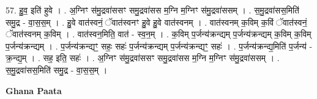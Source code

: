 \documentclass[17pt]{extarticle}
\begin{document}
57. हु॒व॒ इति॑ हुवे । . अ॒ग्निꣳ स॑मु॒द्रवा॑ससꣳ समु॒द्रवा॑सस म॒ग्नि म॒ग्निꣳ स॑मु॒द्रवा॑ससम् । . स॒मु॒द्रवा॑सस॒मिति॑ समु॒द्र - वा॒स॒स॒म् । . हु॒वे वात॑स्वनं॒ ॅवात॑स्वनꣳ हु॒वे हु॒वे वात॑स्वनम् । . वात॑स्वनम् क॒विम् क॒विं ॅवात॑स्वनं॒ ॅवात॑स्वनम् क॒विम् । . वात॑स्वन॒मिति॒ वात॑ - स्व॒न॒म् । . क॒विम् प॒र्जन्य॑क्रन्द्यम् प॒र्जन्य॑क्रन्द्यम् क॒विम् क॒विम् प॒र्जन्य॑क्रन्द्यम् । . प॒र्जन्य॑क्रन्द्यꣳ॒॒ सहः॒ सहः॑ प॒र्जन्य॑क्रन्द्यम् प॒र्जन्य॑क्रन्द्यꣳ॒॒ सहः॑ । . प॒र्जन्य॑क्रन्द्य॒मिति॑ प॒र्जन्य॑ - क्र॒न्द्य॒म् । . सह॒ इति॒ सहः॑ । . अ॒ग्निꣳ स॑मु॒द्रवा॑ससꣳ समु॒द्रवा॑सस म॒ग्नि म॒ग्निꣳ स॑मु॒द्रवा॑ससम् । . स॒मु॒द्रवा॑सस॒मिति॑ समु॒द्र - वा॒स॒स॒म् । \newline

\textbf{Ghana Paata } \newline
\end{document}
